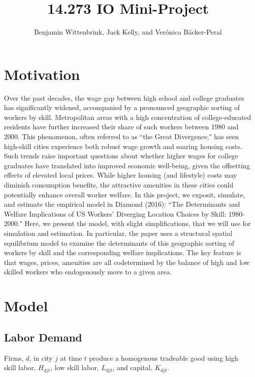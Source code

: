 \documentclass{article}
\title{14.273 IO Mini-Project}
\author{Benjamin Wittenbrink, Jack Kelly, and Verónica Bäcker-Peral}
\begin{document}
\maketitle

\section{Motivation}

Over the past decades, the wage gap between high school and college graduates has significantly widened, accompanied by a pronounced geographic sorting of workers by skill. Metropolitan areas with a high concentration of college-educated residents have further increased their share of such workers between 1980 and 2000. This phenomenon, often referred to as ``the Great Divergence," has seen high-skill cities experience both robust wage growth and soaring housing costs. Such trends raise important questions about whether higher wages for college graduates have translated into improved economic well-being, given the offsetting effects of elevated local prices. While higher housing (and lifestyle) costs may diminish consumption benefits, the attractive amenities in these cities could potentially enhance overall worker welfare. In this project, we exposit, simulate, and estimate the empirical model in Diamond (2016): ``The Determinants and Welfare Implications of US Workers' Diverging Location Choices by Skill: 1980-2000." Here, we present the model, with slight simplifications, that we will use for simulation and estimation. 
In particular, the paper uses a structural spatial equilibrium model to examine the determinants of this geographic sorting of workers by skill and the corresponding welfare implications. The key feature is that wages, prices, amenities are all codetermined by the balance of high and low skilled workers who endogenously move to a given area. 

\section{Model}

\subsection{Labor Demand}
Firms, $d$, in city $j$ at time $t$ produce a homogenous tradeable good using high skill labor, $H_{djt}$, low skill labor, $L_{djt}$, and capital, $K_{djt}$. 
\end{document}
